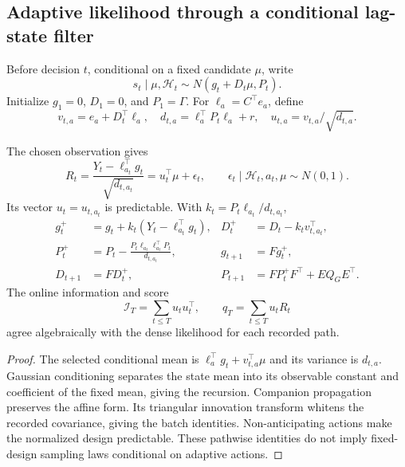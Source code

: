 \subsection{Adaptive likelihood through a conditional lag-state filter}
Before decision $t$, conditional on a fixed candidate $\mu$, write
\begin{equation}
s_t\mid\mu,\mathcal H_t\sim N(g_t+D_t\mu,P_t).
\end{equation}
Initialize $g_1=0$, $D_1=0$, and $P_1=\Gamma$. For $\ell_a=C^\top e_a$, define
\begin{equation}
v_{t,a}=e_a+D_t^\top\ell_a,\quad
d_{t,a}=\ell_a^\top P_t\ell_a+r,\quad
u_{t,a}=v_{t,a}/\sqrt{d_{t,a}}.
\label{spatiotemporal_bandits:eq:experiment}
\end{equation}
\begin{theorem}
The chosen observation gives
\begin{equation}
\boxed{R_t=\frac{Y_t-\ell_{a_t}^\top g_t}{\sqrt{d_{t,a_t}}}
=u_t^\top\mu+\epsilon_t,\qquad
\epsilon_t\mid\mathcal H_t,a_t,\mu\sim N(0,1).}
\label{spatiotemporal_bandits:eq:regression}
\end{equation}
Its vector $u_t=u_{t,a_t}$ is predictable. With $k_t=P_t\ell_{a_t}/d_{t,a_t}$,
\begin{align}
g_t^+&=g_t+k_t(Y_t-\ell_{a_t}^\top g_t),&
D_t^+&=D_t-k_tv_{t,a_t}^\top,\nonumber\\
P_t^+&=P_t-\frac{P_t\ell_{a_t}\ell_{a_t}^\top P_t}{d_{t,a_t}},&
g_{t+1}&=Fg_t^+,\nonumber\\
D_{t+1}&=FD_t^+,&P_{t+1}&=FP_t^+F^\top+EQ_GE^\top.
\label{spatiotemporal_bandits:eq:filter}
\end{align}
The online information and score
\begin{equation}
\mathcal I_T=\sum_{t\le T}u_tu_t^\top,\qquad q_T=\sum_{t\le T}u_tR_t
\label{spatiotemporal_bandits:eq:online}
\end{equation}
agree algebraically with the dense likelihood for each recorded path.
\end{theorem}
\begin{proof}
The selected conditional mean is $\ell_a^\top g_t+v_{t,a}^\top\mu$ and its variance is $d_{t,a}$. Gaussian conditioning separates the state mean into its observable constant and coefficient of the fixed mean, giving the recursion. Companion propagation preserves the affine form. Its triangular innovation transform whitens the recorded covariance, giving the batch identities. Non-anticipating actions make the normalized design predictable. These pathwise identities do not imply fixed-design sampling laws conditional on adaptive actions.
\end{proof}

